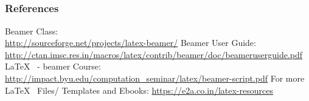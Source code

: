 \documentclass[[newPxFont]{beamer}
\begin{document}
\subsection{}
\begin{frame}
  \frametitle{References}
\begin{block}{}
\begin{scriptsize}
\begin{thebibliography}{30}
Beamer Class:\\ \url{http://sourceforge.net/projects/latex-beamer/}
Beamer User Guide:\\
\url{http://ctan.imsc.res.in/macros/latex/contrib/beamer/doc/beameruserguide.pdf}
\LaTeX~ - beamer Course:
\url{http://impact.byu.edu/computation_seminar/latex/beamer-script.pdf}
{\color{red}For more \LaTeX~ Files/ Templates and Ebooks:
\url{https://e2a.co.in/latex-resources}}
\end{thebibliography}
\end{scriptsize}
\end{block}
\end{frame}
\iffalse
{}
\begin{frame}[plain]
\end{frame}
\end{document}
